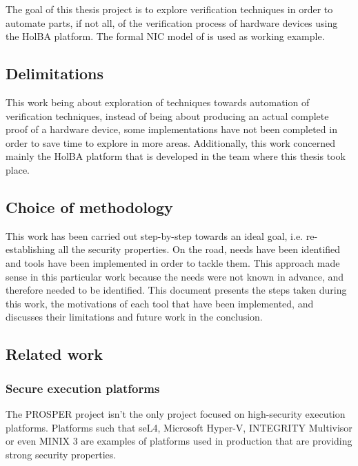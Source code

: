 \documentclass[10pt,a4paper]{article}
\begin{document}
\begin{multicols}{2}
The goal of this thesis project is to explore verification techniques in order to automate parts, if not all, of the verification process of hardware devices using the HolBA platform. The formal {NIC} model of \cite{haglund_formal_2016} is used as working example.

\subsection{Delimitations}

This work being about exploration of techniques towards automation of verification techniques, instead of being about producing an actual complete proof of a hardware device, some implementations have not been completed in order to save time to explore in more areas. Additionally, this work concerned mainly the HolBA platform that is developed in the team where this thesis took place.

\subsection{Choice of methodology}

This work has been carried out step-by-step towards an ideal goal, i.e. re-establishing all the security properties. On the road, needs have been identified and tools have been implemented in order to tackle them. This approach made sense in this particular work because the needs were not known in advance, and therefore needed to be identified. This document presents the steps taken during this work, the motivations of each tool that have been implemented, and discusses their limitations and future work in the conclusion.

\subsection{Related work}

\subsubsection{Secure execution platforms}

The {PROSPER} project isn't the only project focused on high-security execution platforms. Platforms such that seL4, Microsoft Hyper-V, INTEGRITY Multivisor or even MINIX 3 are examples of platforms used in production that are providing strong security properties.


\end{multicols}
\end{document}
